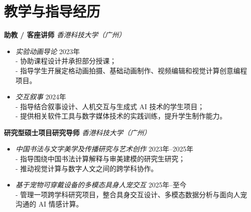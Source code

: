 \section*{教学与指导经历}

\noindent \textbf{助教 / 客座讲师} \hfill \textit{香港科技大学（广州）}
\begin{itemize}[leftmargin=*]
  \item \textit{实验动画导论} \hfill 2023年\\
  - 协助课程设计并承担部分授课；\\
  - 指导学生开展定格动画拍摄、基础动画制作、视频编辑和视觉计算创意编程项目。
  \item \textit{交互叙事} \hfill 2024年\\
  - 指导结合叙事设计、人机交互与生成式 AI 技术的学生项目；\\
  - 提供相关软件工具与数字媒体技术的实践训练，提升学生制作能力。
\end{itemize}

\noindent \textbf{研究型硕士项目研究导师} \hfill \textit{香港科技大学（广州）}
\begin{itemize}[leftmargin=*]
  \item \textit{中国书法与文字美学及传播研究与艺术创作} \hfill 2023年--2025年\\
  - 指导围绕中国书法计算解释与审美建模的研究生研究；\\
  - 推动视觉计算与数字人文之间的跨学科协作。
  \item \textit{基于宠物可穿戴设备的多模态具身人宠交互} \hfill 2025年--至今\\
  - 管理一项跨学科研究项目，整合具身交互设计、多模态数据分析与面向人宠沟通的 AI 情感计算。
\end{itemize}
